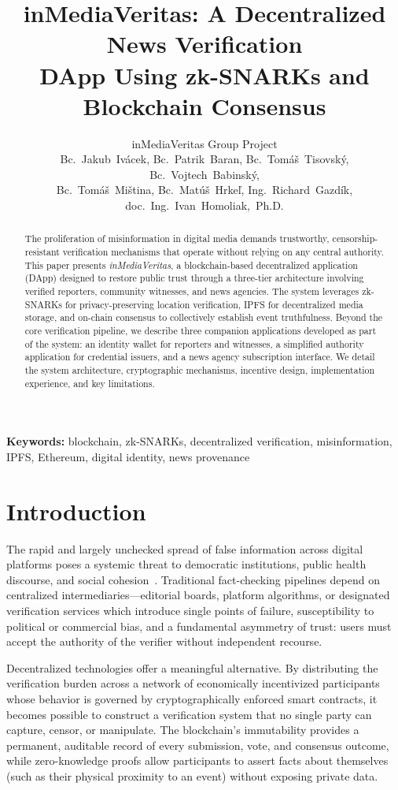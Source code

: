 \documentclass[11pt]{article}
\title{\textbf{inMediaVeritas: A Decentralized News Verification\\
DApp Using zk-SNARKs and Blockchain Consensus}}
\author{
  inMediaVeritas Group Project\\
  \small{Bc.~Jakub~Ivácek,
  Bc.~Patrik~Baran,
  Bc.~Tomáš~Tisovský,
  Bc.~Vojtech~Babinský,}\\
  \small{Bc.~Tomáš~Miština,
  Bc.~Matúš~Hrkeľ,
  Ing.~Richard~Gazdík,
  doc.~Ing.~Ivan~Homoliak,~Ph.D.}
}
\date{}
\begin{document}
\maketitle
\thispagestyle{empty}

\begin{abstract}
\noindent
The proliferation of misinformation in digital media demands trustworthy,
censorship-resistant verification mechanisms that operate without relying on
any central authority. This paper presents \textit{inMediaVeritas}, a
blockchain-based decentralized application (DApp) designed to restore public
trust through a three-tier architecture involving verified reporters, community
witnesses, and news agencies. The system leverages zk-SNARKs for
privacy-preserving location verification, IPFS for decentralized media storage,
and on-chain consensus to collectively establish event truthfulness. Beyond the
core verification pipeline, we describe three companion applications developed
as part of the system: an identity wallet for reporters and witnesses, a
simplified authority application for credential issuers, and a news agency
subscription interface. We detail the system architecture, cryptographic
mechanisms, incentive design, implementation experience, and key limitations.
\end{abstract}

\textbf{Keywords:} blockchain, zk-SNARKs, decentralized verification,
misinformation, IPFS, Ethereum, digital identity, news provenance

\section{Introduction}


The rapid and largely unchecked spread of false information across digital
platforms poses a systemic threat to democratic institutions, public health
discourse, and social cohesion~\cite{lazer2018}. Traditional fact-checking
pipelines depend on centralized intermediaries—editorial boards, platform
algorithms, or designated verification services which introduce single points
of failure, susceptibility to political or commercial bias, and a fundamental
asymmetry of trust: users must accept the authority of the verifier without
independent recourse.

Decentralized technologies offer a meaningful alternative. By distributing the
verification burden across a network of economically incentivized participants
whose behavior is governed by cryptographically enforced smart contracts,
it becomes possible to construct a verification system that no single party
can capture, censor, or manipulate. The blockchain's immutability provides
a permanent, auditable record of every submission, vote, and consensus outcome,
while zero-knowledge proofs allow participants to assert facts about themselves
(such as their physical proximity to an event) without exposing private data.
\end{document}
